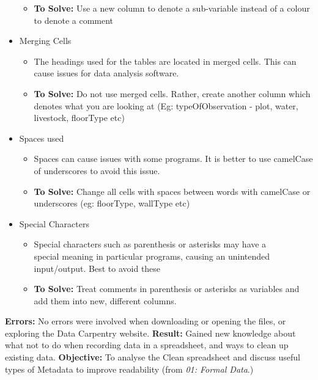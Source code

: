 \documentclass{article}
\begin{document}
\begin{itemize}
\begin{itemize}
        \item \textbf{To Solve:} Use a new column to denote a sub-variable instead of a colour to denote a comment
    \end{itemize}
    \item Merging Cells
    \begin{itemize}
        \item The headings used for the tables are located in merged cells. This can cause issues for data analysis software.
        \item \textbf{To Solve:} Do not use merged cells. Rather, create another column which denotes what you are looking at (Eg: typeOfObservation - plot, water, livestock, floorType etc)
    \end{itemize}
    \item Spaces used
    \begin{itemize}
        \item Spaces can cause issues with some programs. It is better to use camelCase of underscores to avoid this issue.
        \item \textbf{To Solve:} Change all cells with spaces between words with camelCase or underscores (eg: floorType, wallType etc)
    \end{itemize}
    \item Special Characters
    \begin{itemize}
        \item Special characters such as parenthesis or asterisks may have a \\
        special meaning in particular programs, causing an unintended input/output. Best to avoid these
        \item \textbf{To Solve:} Treat comments in parenthesis or asterisks as variables and add them into new, different columns.
    \end{itemize}
\end{itemize}
\textbf{Errors:} No errors were involved when downloading or opening the files, or exploring the Data Carpentry website.
\newline
\textbf{Result:} Gained new knowledge about what not to do when recording data in a spreadsheet, and ways to clean up existing data.
\vspace{5mm}
\newline
\textbf{Objective:} To analyse the Clean spreadsheet and discuss useful types of Metadata to improve readability (from \textit{01: Formal Data}.)
\end{document}
